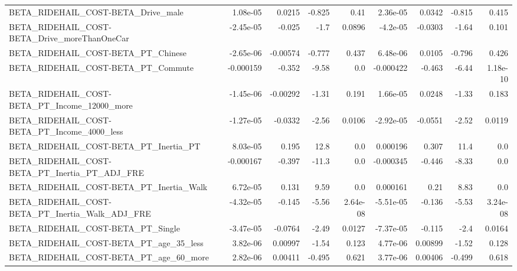 \begin{tabular}{lrrrrrrrr}
BETA\_RIDEHAIL\_COST-BETA\_Drive\_male                 &    1.08e-05 &       0.0215 &   -0.825 &     0.41 &   2.36e-05 &      0.0342 &       -0.815 &         0.415 \\
BETA\_RIDEHAIL\_COST-BETA\_Drive\_moreThanOneCar       &   -2.45e-05 &       -0.025 &     -1.7 &   0.0896 &   -4.2e-05 &     -0.0303 &        -1.64 &         0.101 \\
BETA\_RIDEHAIL\_COST-BETA\_PT\_Chinese                 &   -2.65e-06 &     -0.00574 &   -0.777 &    0.437 &   6.48e-06 &      0.0105 &       -0.796 &         0.426 \\
BETA\_RIDEHAIL\_COST-BETA\_PT\_Commute                 &   -0.000159 &       -0.352 &    -9.58 &      0.0 &  -0.000422 &      -0.463 &        -6.44 &      1.18e-10 \\
BETA\_RIDEHAIL\_COST-BETA\_PT\_Income\_12000\_more       &   -1.45e-06 &     -0.00292 &    -1.31 &    0.191 &   1.66e-05 &      0.0248 &        -1.33 &         0.183 \\
BETA\_RIDEHAIL\_COST-BETA\_PT\_Income\_4000\_less        &   -1.27e-05 &      -0.0332 &    -2.56 &   0.0106 &  -2.92e-05 &     -0.0551 &        -2.52 &        0.0119 \\
BETA\_RIDEHAIL\_COST-BETA\_PT\_Inertia\_PT              &    8.03e-05 &        0.195 &     12.8 &      0.0 &   0.000196 &       0.307 &         11.4 &           0.0 \\
BETA\_RIDEHAIL\_COST-BETA\_PT\_Inertia\_PT\_ADJ\_FRE      &   -0.000167 &       -0.397 &    -11.3 &      0.0 &  -0.000345 &      -0.446 &        -8.33 &           0.0 \\
BETA\_RIDEHAIL\_COST-BETA\_PT\_Inertia\_Walk            &    6.72e-05 &        0.131 &     9.59 &      0.0 &   0.000161 &        0.21 &         8.83 &           0.0 \\
BETA\_RIDEHAIL\_COST-BETA\_PT\_Inertia\_Walk\_ADJ\_FRE    &   -4.32e-05 &       -0.145 &    -5.56 & 2.64e-08 &  -5.51e-05 &      -0.136 &        -5.53 &      3.24e-08 \\
BETA\_RIDEHAIL\_COST-BETA\_PT\_Single                  &   -3.47e-05 &      -0.0764 &    -2.49 &   0.0127 &  -7.37e-05 &      -0.115 &         -2.4 &        0.0164 \\
BETA\_RIDEHAIL\_COST-BETA\_PT\_age\_35\_less             &    3.82e-06 &      0.00997 &    -1.54 &    0.123 &   4.77e-06 &     0.00899 &        -1.52 &         0.128 \\
BETA\_RIDEHAIL\_COST-BETA\_PT\_age\_60\_more             &    2.82e-06 &      0.00411 &   -0.495 &    0.621 &   3.77e-06 &     0.00406 &       -0.499 &         0.618 \\

\end{tabular}
